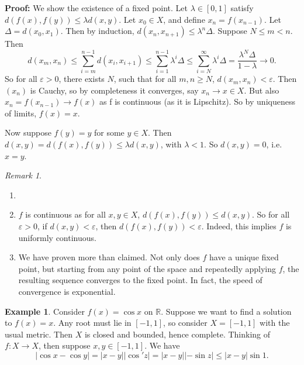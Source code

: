 \documentclass[12pt]{article}
\theoremstyle{definition}
\newtheorem{example}{Example}[section]
\theoremstyle{remark}
\newtheorem*{remark}{Remark}
\begin{document}
\begin{adjustbox}{minipage = \columnwidth - 25.5pt, margin=1em, frame=1pt, margin=0em}
	\textbf{Proof:} We show the existence of a fixed point. Let $\lambda \in [0, 1]$ satisfy $d(f(x), f(y)) \leq \lambda d(x, y)$. Let $x_0 \in X$, and define $x_n = f(x_{n-1})$. Let $\Delta = d(x_0, x_1)$. Then by induction, $d(x_n, x_{n+1}) \leq \lambda^{n} \Delta$. Suppose $N \leq m < n$. Then
	\[
		d(x_m, x_n) \leq \sum_{i = m}^{n-1}d(x_i, x_{i+1}) \leq \sum_{i = 1}^{n-1} \lambda^{i} \Delta \leq \sum_{i = N}^{\infty} \lambda^{i} \Delta = \frac{\lambda^{N}\Delta}{1 - \lambda} \to 0
	.\]
	So for all $\varepsilon > 0$, there exists $N$, such that for all $m, n \geq N$, $d(x_m, x_n) < \varepsilon$. Then $(x_n)$ is Cauchy, so by completeness it converges, say $x_n \to x \in X$. But also $x_n = f(x_{n-1}) \to f(x)$ as f is continuous (as it is Lipschitz). So by uniqueness of limits, $f(x) = x$.

	Now suppose $f(y) = y$ for some $y \in X$. Then $d(x, y) = d(f(x), f(y)) \leq \lambda d(x, y)$, with $\lambda < 1$. So $d(x, y) = 0$, i.e. $x = y$.
\end{adjustbox}

\begin{remark}
	\begin{enumerate}[1.]
		\item[]
		\item $f$ is continuous as for all $x, y \in X$, $d(f(x), f(y)) \leq d(x, y)$. So for all $\varepsilon > 0$, if $d(x, y) < \varepsilon$, then $d(f(x), f(y)) < \varepsilon$. Indeed, this implies $f$ is uniformly continuous.
		\item We have proven more than claimed. Not only does $f$ have a unique fixed point, but starting from any point of the space and repeatedly applying $f$, the resulting sequence converges to the fixed point. In fact, the speed of convergence is exponential.
	\end{enumerate}
\end{remark}

\begin{adjustbox}{minipage = \columnwidth - 25.5pt, margin=1em, frame=1pt, margin=0em}
\begin{example}
	Consider $f(x) = \cos x$ on $\mathbb{R}$. Suppose we want to find a solution to $f(x) = x$. Any root must lie in $[-1, 1]$, so consider $X = [-1, 1]$ with the usual metric. Then $X$ is closed and bounded, hence complete. Thinking of $f : X \to X$, then suppose $x, y \in [-1, 1]$. We have
	\[
	|\cos x - \cos y| = |x - y||\cos' z| = |x - y||- \sin z| \leq |x - y| \sin 1
	.\]
\end{example}
\end{adjustbox}
\end{document}
